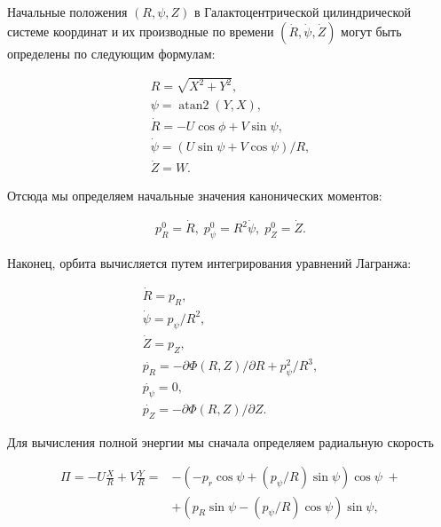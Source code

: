 \documentclass[a4paper, oneside]{article}
\newcommand{\su}{\vspace{-0.5em}}
\DeclareMathOperator{\atantwo}{atan2}
\begin{document}
Начальные положения $ (R, \psi, Z) $ в Галактоцентрической цилиндрической системе координат и их производные по времени $ (\dot{R}, \dot{\psi}, \dot{Z}) $ могут быть определены по следующим формулам:

\su
\begin{equation}
\begin{gathered}
  R = \sqrt{X^2 + Y^2}, \\
  \psi = \atantwo(Y, X), \\
  \dot{R} = -U \cos{\phi} + V \sin{\psi}, \\
  \dot{\psi} = (U \sin{\psi} + V \cos{\psi}) / R, \\
  \dot{Z} = W.
\end{gathered}
\end{equation}

Отсюда мы определяем начальные значения канонических моментов:

\su
\begin{equation}
\begin{aligned}
  p_R^0 = \dot{R}, \; p_\psi^0 = R^2 \dot{\psi}, \; p_Z^0 = \dot{Z}.
\end{aligned}
\end{equation}

Наконец, орбита вычисляется путем интегрирования уравнений Лагранжа:

\begin{equation}
\begin{gathered}
  \dot{R} = p_R, \\
  \dot{\psi} = p_\psi / R^2, \\
  \dot{Z} = p_Z, \\
  \dot{p_R} = - \partial \Phi(R, Z) / \partial R + p_\psi^2 / R^3, \\
  \dot{p_\psi} = 0, \\
  \dot{p_Z} = - \partial \Phi(R, Z) / \partial Z.
\end{gathered}
\end{equation}

Для вычисления полной энергии мы сначала определяем радиальную скорость

\su
\begin{equation}
\begin{aligned}
  \Pi = -U \frac{X}{R} + V \frac{Y}{R} = & -(-p_r \cos{\psi} + (p_\psi / R) \sin{\psi}) \cos{\psi} \; + \\
  & + (p_R \sin{\psi} - (p_\psi / R) \cos{\psi}) \sin{\psi},
\end{aligned}
\end{equation}
\end{document}

